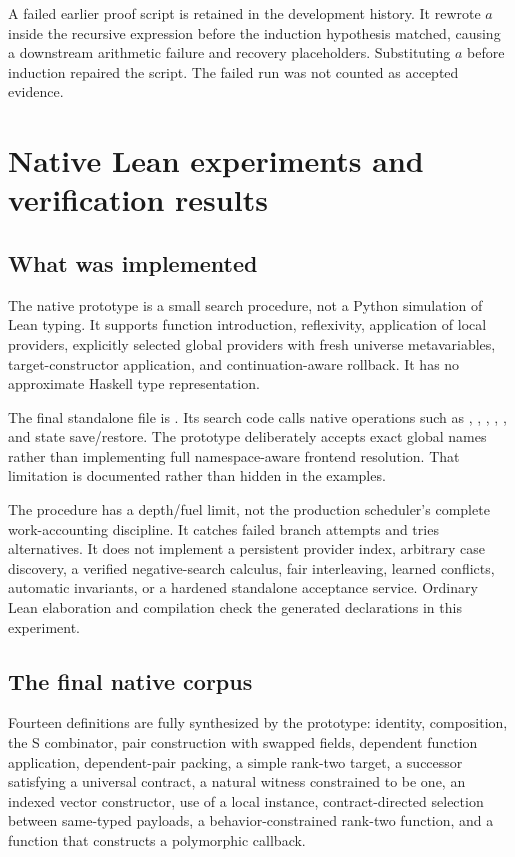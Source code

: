 A failed earlier proof script is retained in the development history. It rewrote $a$ inside the recursive expression before the induction hypothesis matched, causing a downstream arithmetic failure and recovery placeholders. Substituting $a$ before induction repaired the script. The failed run was not counted as accepted evidence.

\section{Native Lean experiments and verification results}
\label{sec:experiments}
\subsection{What was implemented}
The native prototype is a small  search procedure, not a Python simulation of Lean typing. It supports function introduction, reflexivity, application of local providers, explicitly selected global providers with fresh universe metavariables, target-constructor application, and continuation-aware rollback. It has no approximate Haskell type representation.

The final standalone file is . Its search code calls native operations such as , , , , , and state save/restore. The  prototype deliberately accepts exact global names rather than implementing full namespace-aware frontend resolution. That limitation is documented rather than hidden in the examples.

The procedure has a depth/fuel limit, not the production scheduler's complete work-accounting discipline. It catches failed branch attempts and tries alternatives. It does not implement a persistent provider index, arbitrary case discovery, a verified negative-search calculus, fair interleaving, learned conflicts, automatic invariants, or a hardened standalone acceptance service. Ordinary Lean elaboration and compilation check the generated declarations in this experiment.

\subsection{The final native corpus}
Fourteen definitions are fully synthesized by the prototype: identity, composition, the S combinator, pair construction with swapped fields, dependent function application, dependent-pair packing, a simple rank-two target, a successor satisfying a universal contract, a natural witness constrained to be one, an indexed vector constructor, use of a local  instance, contract-directed selection between same-typed payloads, a behavior-constrained rank-two function, and a function that constructs a polymorphic callback.

